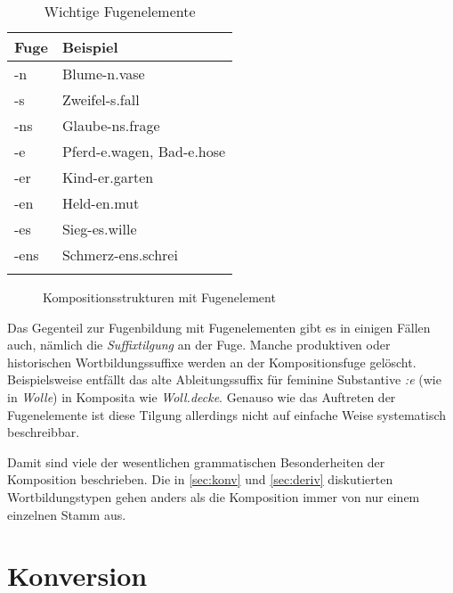 \begin{table}
  \centering
  \begin{tabular}{ll}
    \lsptoprule
    \textbf{Fuge} & \textbf{Beispiel} \\
    \midrule
    -n & Blume-n.vase \\
    -s & Zweifel-s.fall \\
    -ns & Glaube-ns.frage \\
    -e & Pferd-e.wagen, Bad-e.hose \\
    -er & Kind-er.garten \\
    -en & Held-en.mut \\
    -es & Sieg-es.wille \\
    -ens & Schmerz-ens.schrei \\
    \lspbottomrule
  \end{tabular}
  \caption{Wichtige Fugenelemente}
  \label{tab:fugen}
\end{table}

\begin{figure}
  \centering
  \caption{Kompositionsstrukturen mit Fugenelement}
  \label{fig:kompfugstruk}
\end{figure}

Das Gegenteil zur Fugenbildung mit Fugenelementen gibt es in einigen Fällen auch, nämlich die \textit{Suffixtilgung} an der Fuge.
Manche produktiven oder historischen Wortbildungssuffixe werden an der Kompositionsfuge gelöscht.
Beispielsweise entfällt das alte Ableitungssuffix für feminine Substantive \textit{:e} (wie in \textit{Wolle}) in Komposita wie \textit{Woll.decke}.
Genauso wie das Auftreten der Fugenelemente ist diese Tilgung allerdings nicht auf einfache Weise systematisch beschreibbar.

Damit sind viele der wesentlichen grammatischen Besonderheiten der Komposition beschrieben.
Die in \ref{sec:konv} und \ref{sec:deriv} diskutierten Wortbildungstypen gehen anders als die Komposition immer von nur einem einzelnen Stamm aus.

\section{Konversion}

